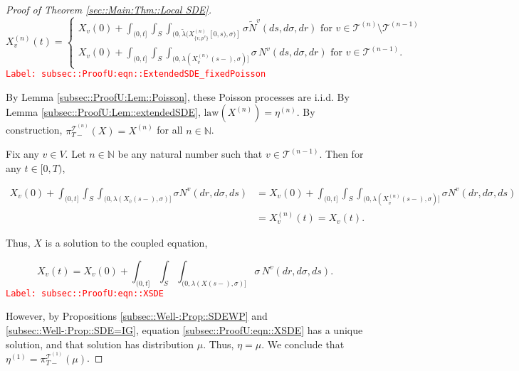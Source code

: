 \documentclass[12pt]{article}
\newcommand{\mb}{\mathbb}
\newcommand{\mc}{\mathcal}
\newcommand{\ov}{\overline}
\newcommand{\te}{\text}
\newcommand{\tr}{\textcolor{red}}
\newcommand{\labe}[1]{\tr{\texttt{Label: #1}}}
\newcommand{\ind}{\hspace{24pt}}
\renewcommand{\v}{v}							%
\renewcommand{\S}{S}							%
\newcommand{\s}{\sigma}							%
\newcommand{\T}{T}								%
\renewcommand{\t}{t}							%
\newcommand{\proj}{\pi}							%
\renewcommand{\tt}{s}							%
\newcommand{\X}{X}								%
\newcommand{\vind}[1]{^{#1}}					%
\newcommand{\vsi}[1]{^{#1}}						%
\newcommand{\cind}[1]{_{#1}}					%
\newcommand{\cl}{\ov}							%
\newcommand{\tp}[1]{(#1)}						%
\newcommand{\tip}[1]{#1}						%
\newcommand{\ts}[1]{_{#1}}						%
\newcommand{\tree}{\mc{T}}						%
\newcommand{\sln}[1]{^{(#1)}}					%
\newcommand{\poiss}{N}							%
\newcommand{\rate}{\lambda}						%
\renewcommand{\r}{r}							%
\newcommand{\alt}[1]{\widetilde{#1}}			%
\newcommand{\m}{\mu}							%
\newcommand{\mmm}{\eta}							%
\newcommand{\crate}{\alt{\lambda}}				%
\newcommand{\p}{p}								%
\begin{document}
\begin{proof}[Proof of Theorem \ref{sec::Main:Thm::Local SDE}]
\begin{equation}
\X\sln{n}\cind{\v}\tp{\t} = \begin{cases}
\X\cind{\v}\tp{0} + \int_{(0,\t]}\int_\S\int_{(0,\crate(\X\sln{n}\cind{\{\v,\p\vind{\v}\}}\tip{[0,\tt)},\s)]}\s\alt{\poiss}\vind{\v}(d\tt,d\s,d\r)\te{ for } \v \in \tree\sln{n}\setminus\tree\sln{n-1}\\
\X\cind{\v}\tp{0} + \int_{(0,\t]}\int_\S\int_{(0,\rate(\X\sln{n}\cind{\cl{\v}}\tp{\tt-},\s)]}\s\,\poiss\vind{\v}(d\tt,d\s,d\r)\te{ for } \v \in \tree\sln{n-1}.
\end{cases}
\label{subsec::ProofU:eqn::ExtendedSDE_fixedPoisson}
\end{equation}
\labe{subsec::ProofU:eqn::ExtendedSDE\_fixedPoisson}

By Lemma \ref{subsec::ProofU:Lem::Poisson}, these Poisson processes are i.i.d. By Lemma \ref{subsec::ProofU:Lem::extendedSDE}, \(\te{law}(\X\sln{n}) = \mmm\sln{n}\). By construction, \(\proj\vsi{\tree\sln{n}}\ts{\T-}(\X) = \X\sln{n}\) for all \(n\in\mb{N}\).

\ind Fix any \(\v\in V\). Let \(n\in \mb{N}\) be any natural number such that \(\v\in \tree\sln{n-1}\). Then for any \(\t \in [0,\T)\),

\begin{align*}
\X\cind{\v}\tp{0} + \int_{(0,\t]}\int_\S\int_{(0,\rate(\X\cind{\cl{\v}}\tp{\tt-},\s)]}\s\poiss\vind{\v}(d\r,d\s,d\tt) &= \X\cind{\v}\tp{0} + \int_{(0,\t]}\int_\S\int_{(0,\rate(\X\sln{n}\cind{\cl{\v}}\tp{\tt-},\s)]}\s\poiss\vind{\v}(d\r,d\s,d\tt)\\
&=\X\sln{n}\cind{\v}\tp{\t} = \X\cind{\v}\tp{\t}.
\end{align*}

Thus, \(\X\) is a solution to the coupled equation,

\begin{equation}
\X\cind{\v}\tp{\t} = \X\cind{\v}\tp{0} + \int_{(0,\t]}\int_\S \int_{(0,\rate(\X\tp{\tt-},\s)]}\s\,\poiss\vind{\v}(d\r,d\s,d\tt).
\label{subsec::ProofU:eqn::XSDE}
\end{equation}
\labe{subsec::ProofU:eqn::XSDE}

However, by Propositions \ref{subsec::Well-:Prop::SDEWP} and \ref{subsec::Well-:Prop::SDE=IG}, equation \eqref{subsec::ProofU:eqn::XSDE} has a unique solution, and that solution has distribution \(\m\). Thus, \(\mmm = \m\). We conclude that \(\mmm\sln{1} = \proj\vsi{\tree\sln{1}}\ts{\T-}(\m)\).

\end{proof}
\end{document}
